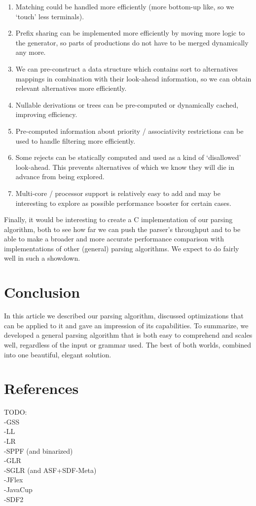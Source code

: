 \documentclass[a4paper,10pt]{article}
\begin{document}
\begin{enumerate}
 \setlength{\itemsep}{0pt}
 \setlength{\parskip}{0pt}
 \setlength{\parsep}{0pt}
 
 \item Matching could be handled more efficiently (more bottom-up like, so we `touch' less terminals).
 \item Prefix sharing can be implemented more efficiently by moving more logic to the generator, so parts of productions do not have to be merged dynamically any more.
 \item We can pre-construct a data structure which contains sort to alternatives mappings in combination with their look-ahead information, so we can obtain relevant alternatives more efficiently.
 \item Nullable derivations or trees can be pre-computed or dynamically cached, improving efficiency.
 \item Pre-computed information about priority / associativity restrictions can be used to handle filtering more efficiently.
 \item Some rejects can be statically computed and used as a kind of `disallowed' look-ahead. This prevents alternatives of which we know they will die in advance from being explored.
 \item Multi-core / processor support is relatively easy to add and may be interesting to explore as possible performance booster for certain cases.
\end{enumerate}

Finally, it would be interesting to create a C implementation of our parsing algorithm, both to see how far we can push the parser's throughput and to be able to make a broader and more accurate performance comparison with implementations of other (general) parsing algorithms. We expect to do fairly well in such a showdown.

\section{Conclusion}

In this article we described our parsing algorithm, discussed optimizations that can be applied to it and gave an impression of its capabilities. To summarize, we developed a general parsing algorithm that is both easy to comprehend and scales well, regardless of the input or grammar used. The best of both worlds, combined into one beautiful, elegant solution.

\pagebreak
\section{References}

TODO:\\
-GSS\\
-LL\\
-LR\\
-SPPF (and binarized)\\
-GLR\\
-SGLR (and ASF+SDF-Meta)\\
-JFlex\\
-JavaCup\\
-SDF2
\end{document}
